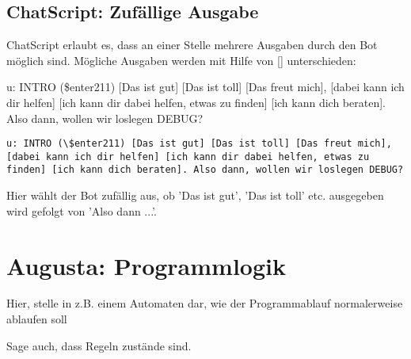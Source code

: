 \section{ChatScript: Zufällige Ausgabe}
\label{sec:ChatScript: Zufällige Ausgabe}

ChatScript erlaubt es, dass an einer Stelle mehrere Ausgaben durch den Bot möglich sind. Mögliche Ausgaben werden mit Hilfe von [] unterschieden:

u: INTRO (\$enter211) [Das ist gut] [Das ist toll] [Das freut mich], [dabei kann ich dir helfen] [ich kann dir dabei helfen, etwas zu finden] [ich kann dich beraten]. Also dann, wollen wir loslegen DEBUG?

\begin{lstlisting}[caption={Regel in keyexonesentence.top}]
u: INTRO (\$enter211) [Das ist gut] [Das ist toll] [Das freut mich], [dabei kann ich dir helfen] [ich kann dir dabei helfen, etwas zu finden] [ich kann dich beraten]. Also dann, wollen wir loslegen DEBUG?
\end{lstlisting}

Hier wählt der Bot zufällig aus, ob 'Das ist gut', 'Das ist toll' etc. ausgegeben wird gefolgt von 'Also dann ...'. 

\chapter{Augusta: Programmlogik}
\label{sec:Augusta: Programmlogik}



Hier, stelle in z.B. einem Automaten dar, wie der Programmablauf normalerweise ablaufen soll

Sage auch, dass Regeln zustände sind.

